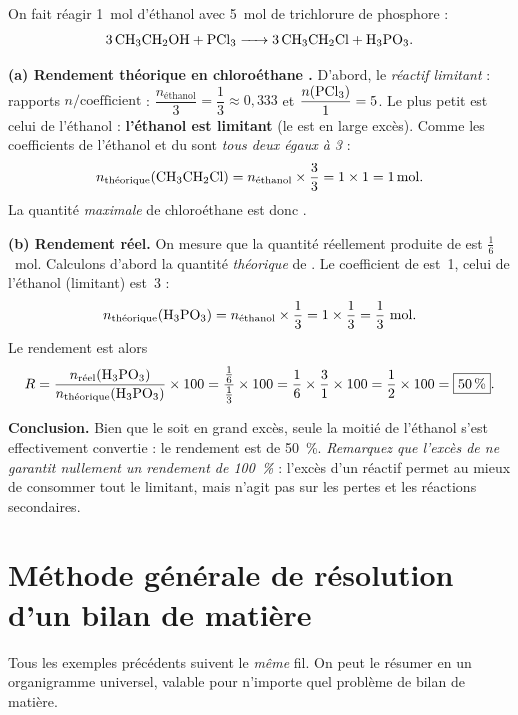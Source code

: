 \documentclass[11pt,a4paper]{article}
\newcommand{\nq}[1]{n_{\text{#1}}}        %
\begin{document}
\begin{exemple}
On fait réagir \SI{1}{\mole} d'éthanol avec \SI{5}{\mole} de trichlorure de phosphore  :
\[
\ce{3 CH3CH2OH + PCl3 -> 3 CH3CH2Cl + H3PO3}.
\]

\textbf{(a) Rendement théorique en chloroéthane .}
D'abord, le \emph{réactif limitant} : rapports $n/\text{coefficient}$ :
$\dfrac{\nq{éthanol}}{3}=\dfrac{1}{3}\approx0,333$ et $\dfrac{n(\ce{PCl3})}{1}=5$. Le plus petit est
celui de l'éthanol : \textbf{l'éthanol est limitant} (le  est en large excès). Comme les
coefficients de l'éthanol et du  sont \emph{tous deux égaux à 3} :
\[
n_{\text{théorique}}(\ce{CH3CH2Cl})=\nq{éthanol}\times\frac{3}{3}=1\times1=\SI{1}{\mole}.
\]
La quantité \emph{maximale} de chloroéthane est donc .

\textbf{(b) Rendement réel.} On mesure que la quantité réellement produite de  est
$\frac{1}{6}$~mol. Calculons d'abord la quantité \emph{théorique} de . Le coefficient de
 est~1, celui de l'éthanol (limitant) est~3 :
\[
n_{\text{théorique}}(\ce{H3PO3})=\nq{éthanol}\times\frac{1}{3}=1\times\frac{1}{3}=\frac{1}{3}\ \si{\mole}.
\]
Le rendement est alors
\[
R=\frac{n_{\text{réel}}(\ce{H3PO3})}{n_{\text{théorique}}(\ce{H3PO3})}\times100
 =\frac{\tfrac{1}{6}}{\tfrac{1}{3}}\times100
 =\frac{1}{6}\times\frac{3}{1}\times100
 =\frac{1}{2}\times100=\boxed{\SI{50}{\percent}}.
\]

\textbf{Conclusion.} Bien que le  soit en grand excès, seule la moitié de l'éthanol s'est
effectivement convertie : le rendement est de \SI{50}{\percent}. \emph{Remarquez que l'excès de
 ne garantit nullement un rendement de \SI{100}{\percent}} : l'excès d'un réactif permet
au mieux de consommer tout le limitant, mais n'agit pas sur les pertes et les réactions
secondaires.
\end{exemple}

\section{Méthode générale de résolution d'un bilan de matière}
Tous les exemples précédents suivent le \emph{même} fil. On peut le résumer en un organigramme
universel, valable pour n'importe quel problème de bilan de matière.
\end{document}
